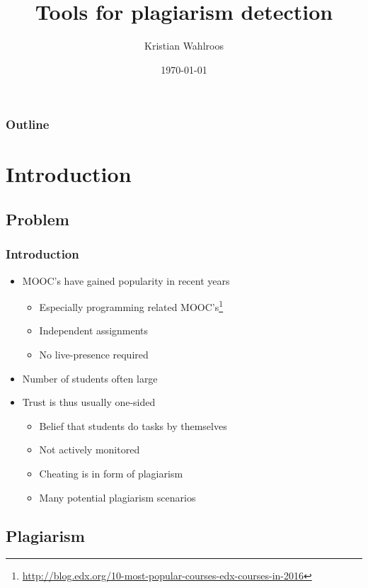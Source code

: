 \documentclass[t,12pt,pdftex]{beamer}
\title{Tools for plagiarism detection}
\author{Kristian Wahlroos}
\institute{University of Helsinki\\Department of Computer Science}
\date{\today}
\begin{document}

\HyTitle

\begin{frame}
	\frametitle{Outline}
	\tableofcontents
\end{frame}



\section{Introduction}

\subsection{Problem}

\begin{frame}
	\frametitle{Introduction}
	
	\begin{itemize}
		\item MOOC's have gained popularity in recent years
		\begin{itemize}
			\item Especially programming related MOOC's\footnote{\url{http://blog.edx.org/10-most-popular-courses-edx-courses-in-2016}}
			\item Independent assignments
			\item No live-presence required
		\end{itemize}
		\item Number of students often large
		\item Trust is thus usually one-sided
		\begin{itemize}
			\item Belief that students do tasks by themselves
			\item Not actively monitored
			\item Cheating is in form of plagiarism
			\item Many potential plagiarism scenarios
		\end{itemize} 
	\end{itemize}
\end{frame}

\subsection{Plagiarism}
\end{document}
